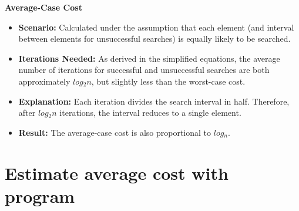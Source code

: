 \documentclass{article}
\begin{document}
\textbf{Average-Case Cost}
\begin{itemize}
    \item \textbf{Scenario:} Calculated under the assumption that each element (and interval between elements for unsuccessful searches) is equally likely to be searched.
    \item \textbf{Iterations Needed:} As derived in the simplified equations, the average number of iterations for successful and unsuccessful searches are both approximately $log⁡_2n$, but slightly less than the worst-case cost.
    \item \textbf{Explanation:} Each iteration divides the search interval in half. Therefore, after $log⁡_2n$ iterations, the interval reduces to a single element.
    \item \textbf{Result:} The average-case cost is also proportional to $log⁡_n$.
\end{itemize}


\section{Estimate average cost with program}

\printbibliography
\end{document}
